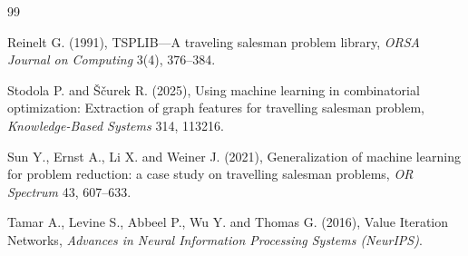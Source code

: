 \documentclass[10pt,twoside]{article}
\numberwithin{equation}{section}
\begin{document}
\begin{thebibliography}{99}


		




		Reinelt G. (1991), TSPLIB---A traveling salesman problem library, {\it ORSA Journal on Computing} 3(4), 376--384.


		




		Stodola P. and \v{S}\v{c}urek R. (2025), Using machine learning in combinatorial optimization: Extraction of graph features for travelling salesman problem, {\it Knowledge-Based Systems} 314, 113216.


		




		Sun Y., Ernst A., Li X. and Weiner J. (2021), Generalization of machine learning for problem reduction: a case study on travelling salesman problems, {\it OR Spectrum} 43, 607--633.


		




		Tamar A., Levine S., Abbeel P., Wu Y. and Thomas G. (2016), Value Iteration Networks, {\it Advances in Neural Information Processing Systems (NeurIPS)}.


		






		






		



\end{thebibliography}
\end{document}
